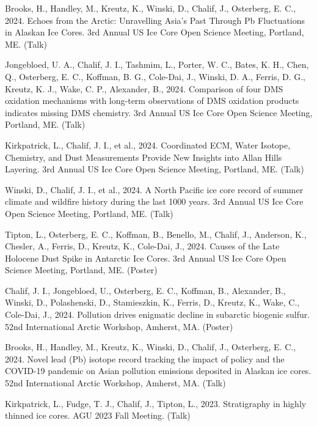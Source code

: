 \documentclass[a4paper,11pt]{article}
\begin{document}
\item[] Brooks, H., Handley, M., Kreutz, K., Winski, D., Chalif, J., Osterberg, E. C., 2024. Echoes from the Arctic: Unravelling Asia's Past Through Pb Fluctuations in Alaskan Ice Cores. 3rd Annual US Ice Core Open Science Meeting, Portland, ME. (Talk)

\item[] Jongebloed, U. A., Chalif, J. I., Tashmim, L., Porter, W. C., Bates, K. H., Chen, Q., Osterberg, E. C., Koffman, B. G., Cole-Dai, J., Winski, D. A., Ferris, D. G., Kreutz, K. J., Wake, C. P., Alexander, B., 2024. Comparison of four DMS oxidation mechanisms with long-term observations of DMS oxidation products indicates missing DMS chemistry. 3rd Annual US Ice Core Open Science Meeting, Portland, ME. (Talk)

\item[] Kirkpatrick, L., Chalif, J. I., et al., 2024. Coordinated ECM, Water Isotope, Chemistry, and Dust Measurements Provide New Insights into Allan Hills Layering. 3rd Annual US Ice Core Open Science Meeting, Portland, ME. (Talk)

\item[] Winski, D., Chalif, J. I., et al., 2024. A North Pacific ice core record of summer climate and wildfire history during the last 1000 years. 3rd Annual US Ice Core Open Science Meeting, Portland, ME. (Talk)

\item[] Tipton, L., Osterberg, E. C., Koffman, B., Benello, M., Chalif, J., Anderson, K., Chesler, A., Ferris, D., Kreutz, K., Cole-Dai, J., 2024. Causes of the Late Holocene Dust Spike in Antarctic Ice Cores. 3rd Annual US Ice Core Open Science Meeting, Portland, ME. (Poster)

\item[] Chalif, J. I., Jongebloed, U., Osterberg, E. C., Koffman, B., Alexander, B., Winski, D., Polashenski, D., Stamieszkin, K., Ferris, D., Kreutz, K., Wake, C., Cole-Dai, J., 2024. Pollution drives enigmatic decline in subarctic biogenic sulfur. 52nd International Arctic Workshop, Amherst, MA. (Poster)

\item[] Brooks, H., Handley, M., Kreutz, K., Winski, D., Chalif, J., Osterberg, E. C., 2024. Novel lead (Pb) isotope record tracking the impact of policy and the COVID-19 pandemic on Asian pollution emissions deposited in Alaskan ice cores. 52nd International Arctic Workshop, Amherst, MA. (Talk)

\item[\textbf{2023}] Kirkpatrick, L., Fudge, T. J., Chalif, J., Tipton, L., 2023. Stratigraphy in highly thinned ice cores. AGU 2023 Fall Meeting. (Talk)
\end{document}
